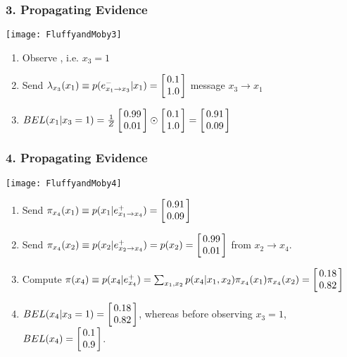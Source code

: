 \begin{frame}
\frametitle{3. Propagating Evidence}

\phantom{.} \hfill 
\texttt{[image: FluffyandMoby3]} 


\vspace*{-5ex}
\begin{enumerate}
\item Observe , i.e. $x_3 = 1$
\vspace*{-2ex}
\item Send $\lambda_{x_3}(x_1) \equiv p(e^-_{x_1 \rightarrow x_3}|x_1) = \left[ \!\!\begin{array}{c} 0.1 \\ 1.0 \end{array} \!\!\right]$  message $x_3
  \rightarrow x_1$
\vspace*{-2ex}
\item $BEL(x_1|x_3=1) = \frac{1}{Z} \vectr{0.99}{0.01} \odot
  \vectr{0.1}{1.0} = \vectr{0.91}{0.09}$ 
\end{enumerate}

\end{frame}
\begin{frame}
\frametitle{4. Propagating Evidence}

\phantom{.} \hfill \texttt{[image: FluffyandMoby4]}

\vspace*{-8ex}
\begin{enumerate}
\addtocounter{enumi}{3}
\item Send $\pi_{x_4}(x_1) \equiv p(x_1|e^+_{x_1 \rightarrow x_4}) =
  \left[ \!\!\begin{array}{c} 0.91 \\ 0.09 \end{array} \!\!\right]$ 
\vspace*{-2ex}
\item Send $\pi_{x_4}(x_2) \equiv p(x_2|e^+_{x_2 \rightarrow x_4}) =
  p(x_2) = \left[ \!\!\begin{array}{c} 0.99 \\ 0.01 \end{array} \!\!\right]$ from $x_2 \rightarrow x_4$.
\vspace*{-2ex}
\item Compute $\pi(x_4) \equiv p(x_4|e^+_{x_4}) = \sum_{x_1,x_2} p(x_4|x_1,x_2)
  \pi_{x_4}(x_1)   \pi_{x_4}(x_2) = \left[ \!\!\begin{array}{c} 0.18 \\ 0.82 \end{array} \!\!\right]$
\vspace*{-2ex}
\item $BEL(x_4|x_3=1) = \left[ \!\!\begin{array}{c} 0.18 \\ 0.82 \end{array} \!\!\right]$, whereas before observing
  $x_3=1$, $BEL(x_4) = \left[ \!\!\begin{array}{c} 0.1 \\ 0.9 \end{array} \!\!\right]$.
\end{enumerate}

\end{frame}

